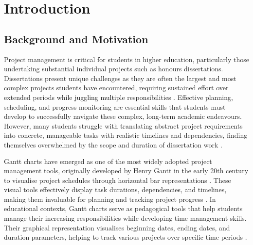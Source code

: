 \documentclass[12pt,nonacm,acmlarge,titlepage,screen]{acmart}
\begin{document}
\newpage
{}

\section{Introduction} \label{cha:intro}



\subsection{Background and Motivation} \label{sec:intro_motiv}

Project management is critical for students in higher education, particularly those undertaking substantial individual projects such as honours dissertations. Dissertations present unique challenges as they are often the largest and most complex projects students have encountered, requiring sustained effort over extended periods while juggling multiple responsibilities \cite{Shives2015}. Effective planning, scheduling, and progress monitoring are essential skills that students must develop to successfully navigate these complex, long-term academic endeavours. However, many students struggle with translating abstract project requirements into concrete, manageable tasks with realistic timelines and dependencies, finding themselves overwhelmed by the scope and duration of dissertation work \cite{Shives2015}.

Gantt charts have emerged as one of the most widely adopted project management tools, originally developed by Henry Gantt in the early 20th century to visualise project schedules through horizontal bar representations \cite{coursera_gantt_2025, geeksforgeeks_gantt_2025}. These visual tools effectively display task durations, dependencies, and timelines, making them invaluable for planning and tracking project progress \cite{aims_ganttchart}. In educational contexts, Gantt charts serve as pedagogical tools that help students manage their increasing responsibilities while developing time management skills. Their graphical representation visualises beginning dates, ending dates, and duration parameters, helping to track various projects over specific time periods \cite{BednjanecAndrea2013AoGc}.
\end{document}
